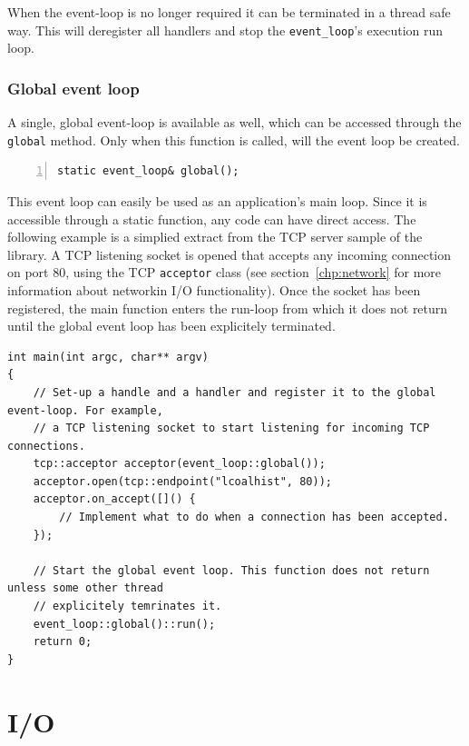 \documentclass[10pt,a4paper,openany]{mudbook}
\makeatletter
\newcommand{\indextt}[2][]{\texttt{#2}\index{#2@\texttt{#2}#1}}
\makeatother
\begin{document}
When the event-loop is no longer required it can be terminated in a thread
safe way. This will deregister all handlers and stop the \texttt{event\_loop}'s
execution run loop.

\section{Global event loop}

A single, global event-loop is available as well, which can be accessed through
the \indextt{global} method. Only when this function is called, will the event
loop be created.

\begin{lstlisting}[style=definition,numbers=left]
static event_loop& global();
\end{lstlisting}

This event loop can easily be used as an application's main loop. Since it is
accessible through a static function, any code can have direct access. The
following example is a simplied extract from the TCP server sample of the
\MUDLib library. A TCP listening socket is opened that accepts any incoming
connection on port 80, using the TCP \indextt{acceptor} class (see
section~\ref{chp:network} for more information about networkin I/O
functionality). Once the socket has been registered, the main function enters
the run-loop from which it does not return until the global event loop has
been explicitely terminated. 

\begin{lstlisting}[style=snippet]
int main(int argc, char** argv)
{
    // Set-up a handle and a handler and register it to the global event-loop. For example,
    // a TCP listening socket to start listening for incoming TCP connections.
    tcp::acceptor acceptor(event_loop::global());
    acceptor.open(tcp::endpoint("lcoalhist", 80));
    acceptor.on_accept([]() {
        // Implement what to do when a connection has been accepted.
    });

    // Start the global event loop. This function does not return unless some other thread
    // explicitely temrinates it.
    event_loop::global()::run();
    return 0;
}
\end{lstlisting}


\part{I/O}
\end{document}
